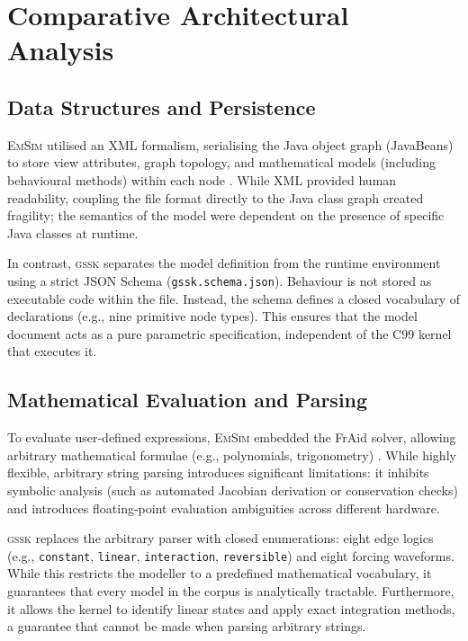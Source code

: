 \documentclass[3p,times,authoryear]{elsarticle}
\newcommand{\gssk}{\textsc{gssk}}
\newcommand{\emsim}{\textsc{EmSim}}
\newcommand{\code}[1]{\texttt{\small #1}}
\begin{document}
\section{Comparative Architectural Analysis}
\label{sec:architecture}

\subsection{Data Structures and Persistence}
\emsim{} utilised an XML formalism, serialising the Java object graph (JavaBeans) to store view attributes, graph topology, and mathematical models (including behavioural methods) within each node \citep{valyi2004}. While XML provided human readability, coupling the file format directly to the Java class graph created fragility; the semantics of the model were dependent on the presence of specific Java classes at runtime.

In contrast, \gssk{} separates the model definition from the runtime environment using a strict JSON Schema (\code{gssk.schema.json}). Behaviour is not stored as executable code within the file. Instead, the schema defines a closed vocabulary of declarations (e.g., nine primitive node types). This ensures that the model document acts as a pure parametric specification, independent of the C99 kernel that executes it.

\subsection{Mathematical Evaluation and Parsing}
To evaluate user-defined expressions, \emsim{} embedded the FrAid solver, allowing arbitrary mathematical formulae (e.g., polynomials, trigonometry) \citep{valyi2004}. While highly flexible, arbitrary string parsing introduces significant limitations: it inhibits symbolic analysis (such as automated Jacobian derivation or conservation checks) and introduces floating-point evaluation ambiguities across different hardware.

\gssk{} replaces the arbitrary parser with closed enumerations: eight edge logics (e.g., \code{constant}, \code{linear}, \code{interaction}, \code{reversible}) and eight forcing waveforms. While this restricts the modeller to a predefined mathematical vocabulary, it guarantees that every model in the corpus is analytically tractable. Furthermore, it allows the kernel to identify linear states and apply exact integration methods, a guarantee that cannot be made when parsing arbitrary strings.
\end{document}
